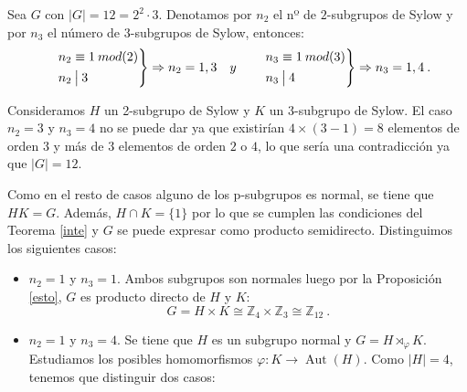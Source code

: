 \begin{Ejemplo} \label{12e}
Sea $G$ con $|G|=12 = 2^2\cdot 3$. Denotamos por $n_2$ el nº de $2$-subgrupos de Sylow y por $n_3$ el número de $3$-subgrupos de Sylow, entonces:
\begin{equation*}
\begin{rcases}
  &n_2  \equiv 1 \: mod(2) \\
  &n_2 \: \big|\: 3
\end{rcases}
\Rightarrow  n_2= 1,3 \quad y \quad 
\begin{rcases}
  &n_3  \equiv 1 \: mod(3) \\
  &n_3  \:\big|\: 4
\end{rcases}
\Rightarrow  n_3 = 1, 4 \:.
\end{equation*}

 
Consideramos $H$ un 2-subgrupo de Sylow y $K$ un 3-subgrupo de Sylow. El caso $n_2=3$ y $n_3=4$ no se puede dar ya que existirían $4\times(3-1)=8$ elementos de orden $3$ y más de $3$ elementos de orden $2$ o $4$, lo que sería una contradicción ya que $|G|=12$.

Como en el resto de casos alguno de los p-subgrupos es normal, se tiene que $HK=G$. Además, $H\cap K = \{1\}$ por lo que se cumplen las condiciones del Teorema \ref{inte} y $G$ se puede expresar como producto semidirecto. Distinguimos los siguientes casos:
\begin{itemize}
    \setlength\itemsep{0.3em}
    \item $n_2=1$ y $n_3=1$. Ambos subgrupos son normales luego por la Proposición \ref{esto}, $G$ es producto directo de $H$ y $K$:
    \[
        G = H\times K \cong \mathbb{Z}_4 \times \mathbb{Z}_3 \cong \mathbb{Z}_{12}\:.
    \]
    
    \item $n_2=1$ y $n_3=4$. Se tiene que $H$ es un subgrupo normal y $G = H \rtimes_{\varphi} K$. Estudiamos los posibles homomorfismos $\varphi \colon K \to \operatorname{Aut}(H)$. Como $|H|=4$, tenemos que distinguir dos casos:
    \vspace{0.2cm}
    

\end{itemize}
\end{Ejemplo}
